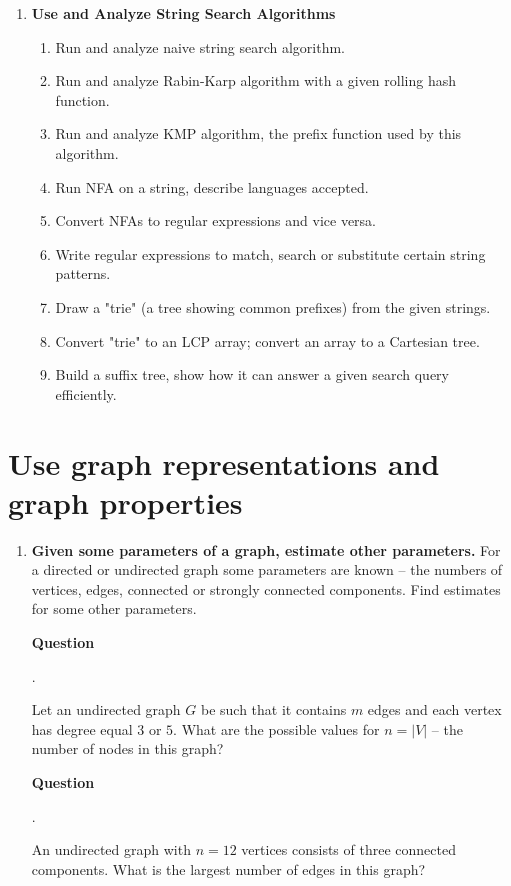 \documentclass[a4paper,12pt]{article}
\newcounter{mcounter}
\newcommand\showmcounter{\addtocounter{mcounter}{1}\themcounter}
\begin{document}
{{\begin{enumerate}
\item \textbf{Use and Analyze String Search Algorithms} 
\begin{enumerate}[label=4.\Alph*.]
\item Run and analyze naive string search algorithm.
\item Run and analyze Rabin-Karp algorithm with a given rolling hash function. 
\item Run and analyze KMP algorithm, the prefix function used by this algorithm. 
\item Run NFA on a string, describe languages accepted. 
\item Convert NFAs to regular expressions and vice versa. 
\item Write regular expressions to match, search or substitute certain string patterns. 
\item Draw a "trie" (a tree showing common prefixes) from the given strings.
\item Convert "trie" to an LCP array; convert an array to a Cartesian tree.
\item Build a suffix tree, show how it can answer a given search query efficiently.
\end{enumerate}
\end{enumerate}
}









\clearpage

\section{Use graph representations and graph properties}


\begin{enumerate}[label=1.\Alph*.]
\item {\bf Given some parameters of a graph, estimate other parameters.}
{\footnotesize For a directed or undirected graph some parameters are known -- the numbers of vertices, edges, connected 
or strongly connected components. Find estimates for some other parameters.}

\vspace{10pt}
{\bf Question \showmcounter.}
Let an undirected graph $G$ be such that it contains $m$ edges and each 
vertex has degree equal $3$ or $5$. What are the possible values for $n = |V|$ --
the number of nodes in this graph?

\vspace{10pt}
{\bf Question \showmcounter.}
An undirected graph with $n = 12$ vertices consists of three connected components. 
What is the largest number of edges in this graph?


\end{enumerate}}
\end{document}
